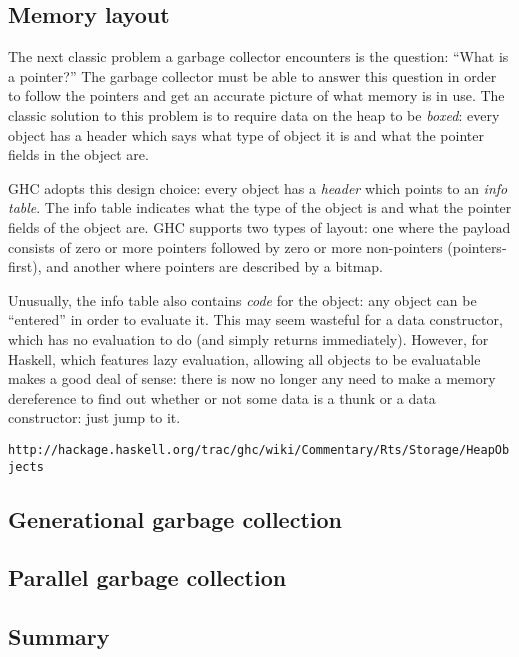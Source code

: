 \subsection{Memory layout}

The next classic problem a garbage collector encounters is the question:
``What is a pointer?''  The garbage collector must be able to answer
this question in order to follow the pointers and get an accurate
picture of what memory is in use.  The classic solution to this problem
is to require data on the heap to be \emph{boxed}: every object has
a header which says what type of object it is and what the pointer fields
in the object are.

GHC adopts this design choice:  every object has a \emph{header} which
points to an \emph{info table}.  The info table indicates what the type of
the object is and what the pointer fields of the object are.  GHC supports
two types of layout: one where the payload consists of zero or more pointers
followed by zero or more non-pointers (pointers-first), and another where
pointers are described by a bitmap.


Unusually, the info table also contains \emph{code} for the object: any
object can be ``entered'' in order to evaluate it.  This may seem
wasteful for a data constructor, which has no evaluation to do (and
simply returns immediately).  However, for Haskell, which features
lazy evaluation, allowing all objects to be evaluatable makes a good
deal of sense: there is now no longer any need to make a memory dereference
to find out whether or not some data is a thunk or a data constructor: just jump
to it. 

\verb|http://hackage.haskell.org/trac/ghc/wiki/Commentary/Rts/Storage/HeapObjects|

\subsection{Generational garbage collection}

\subsection{Parallel garbage collection}

\subsection{Summary}

